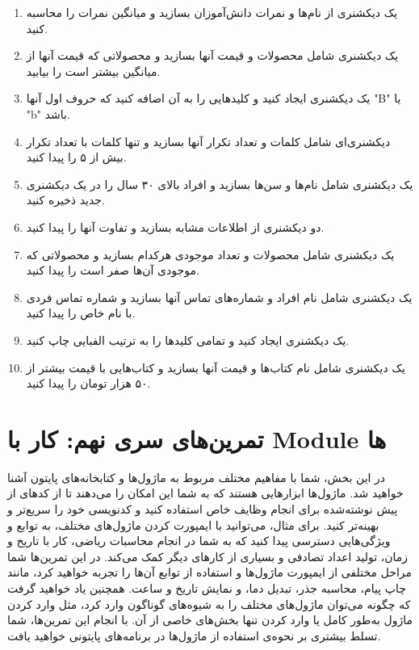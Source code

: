 \documentclass[b5paper,12pt]{article}
\begin{document}
	\begin{enumerate}
		\item یک دیکشنری از نام‌ها و نمرات دانش‌آموزان بسازید و میانگین نمرات را محاسبه کنید.
		\item یک دیکشنری شامل محصولات و قیمت آنها بسازید و محصولاتی که قیمت آنها از میانگین بیشتر است را بیابید.
		\item یک دیکشنری ایجاد کنید و کلیدهایی را به آن اضافه کنید که حروف اول آنها "B" یا "b" باشد.
		\item دیکشنری‌ای شامل کلمات و تعداد تکرار آنها بسازید و تنها کلمات با تعداد تکرار بیش از ۵ را پیدا کنید.
		\item یک دیکشنری شامل نام‌ها و سن‌ها بسازید و افراد بالای ۳۰ سال را در یک دیکشنری جدید ذخیره کنید.
		\item دو دیکشنری از اطلاعات مشابه بسازید و تفاوت آنها را پیدا کنید.
		\item یک دیکشنری شامل محصولات و تعداد موجودی هرکدام بسازید و محصولاتی که موجودی آن‌ها صفر است را پیدا کنید.
		\item یک دیکشنری شامل نام افراد و شماره‌های تماس آنها بسازید و شماره تماس فردی با نام خاص را پیدا کنید.
		\item یک دیکشنری ایجاد کنید و تمامی کلیدها را به ترتیب الفبایی چاپ کنید.
		\item یک دیکشنری شامل نام کتاب‌ها و قیمت آنها بسازید و کتاب‌هایی با قیمت بیشتر از ۵۰ هزار تومان را پیدا کنید.
	\end{enumerate}
	
	\newpage
	\section*{تمرین‌های سری نهم: کار با Module ها}
	در این بخش، شما با مفاهیم مختلف مربوط به ماژول‌ها و کتابخانه‌های پایتون آشنا خواهید شد. ماژول‌ها ابزارهایی هستند که به شما این امکان را می‌دهند تا از کدهای از پیش نوشته‌شده برای انجام وظایف خاص استفاده کنید و کدنویسی خود را سریع‌تر و بهینه‌تر کنید. برای مثال، می‌توانید با ایمپورت کردن ماژول‌های مختلف، به توابع و ویژگی‌هایی دسترسی پیدا کنید که به شما در انجام محاسبات ریاضی، کار با تاریخ و زمان، تولید اعداد تصادفی و بسیاری از کارهای دیگر کمک می‌کند. در این تمرین‌ها شما مراحل مختلفی از ایمپورت ماژول‌ها و استفاده از توابع آن‌ها را تجربه خواهید کرد، مانند چاپ پیام، محاسبه جذر، تبدیل دما، و نمایش تاریخ و ساعت. همچنین یاد خواهید گرفت که چگونه می‌توان ماژول‌های مختلف را به شیوه‌های گوناگون وارد کرد، مثل وارد کردن ماژول به‌طور کامل یا وارد کردن تنها بخش‌های خاصی از آن. با انجام این تمرین‌ها، شما تسلط بیشتری بر نحوه‌ی استفاده از ماژول‌ها در برنامه‌های پایتونی خواهید یافت.
	
\end{document}
